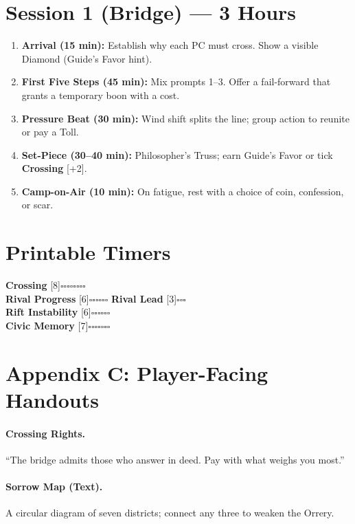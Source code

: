 \documentclass[11pt]{article}
\newcommand{\Clock}[2]{\textbf{#1} [#2]}
\begin{document}
\appendix 


\section{Session 1 (Bridge) --- 3 Hours}
\begin{enumerate}
\item \textbf{Arrival (15 min):} Establish why each PC must cross. Show a visible Diamond (Guide's Favor hint).
\item \textbf{First Five Steps (45 min):} Mix prompts 1--3. Offer a fail-forward that grants a temporary boon with a cost.
\item \textbf{Pressure Beat (30 min):} Wind shift splits the line; group action to reunite or pay a Toll.
\item \textbf{Set-Piece (30--40 min):} Philosopher's Truss; earn Guide's Favor or tick \Clock{Crossing}{+2}.
\item \textbf{Camp-on-Air (10 min):} On fatigue, rest with a choice of coin, confession, or scar.
\end{enumerate}

\section{Printable Timers}
\begin{tcolorbox}[breakable]
\Clock{Crossing}{8}\hfill\(\square\square\square\square\square\square\square\square\)\\[3pt]
\Clock{Rival Progress}{6}\hfill\(\square\square\square\square\square\square\)\quad
\Clock{Rival Lead}{3}\hfill\(\square\square\square\)\\[3pt]
\Clock{Rift Instability}{6}\hfill\(\square\square\square\square\square\square\)\\[3pt]
\Clock{Civic Memory}{7}\hfill\(\square\square\square\square\square\square\square\)
\end{tcolorbox}

\section*{Appendix C: Player-Facing Handouts}
\paragraph{Crossing Rights.} ``The bridge admits those who answer in deed. Pay with what weighs you most.''
\paragraph{Sorrow Map (Text).} A circular diagram of seven districts; connect any three to weaken the Orrery.
\end{document}
